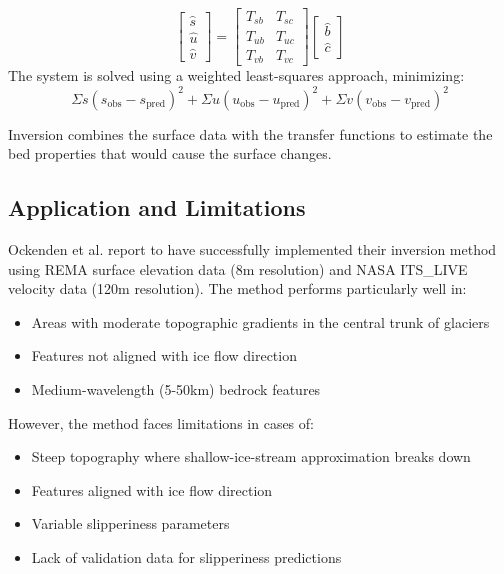 $$\begin{bmatrix}
\hat{s} \\
\hat{u} \\
\hat{v}
\end{bmatrix} =\begin{bmatrix}
T_{sb} & T_{sc} \\
T_{ub} & T_{uc} \\
T_{vb} & T_{vc}
\end{bmatrix}
\begin{bmatrix}
\hat{b}\\
\hat{c}
\end{bmatrix}$$
The system is solved using a weighted least-squares approach, minimizing:
\begin{equation}
\Sigma s(s_{\mathrm{obs}} - s_{\mathrm{pred}})^2 + \Sigma u(u_{\mathrm{obs}} - u_{\mathrm{pred}})^2 + \Sigma v(v_{\mathrm{obs}} - v_{\mathrm{pred}})^2
\end{equation}

Inversion combines the surface data with the transfer functions to estimate the bed properties that would cause the surface changes.

\subsection*{Application and Limitations}

Ockenden et al. report to have successfully implemented their inversion method using REMA surface elevation data (8m resolution) and NASA ITS\_LIVE velocity data (120m resolution). The method performs particularly well in:
\begin{itemize}
\item Areas with moderate topographic gradients in the central trunk of glaciers
\item Features not aligned with ice flow direction
\item Medium-wavelength (5-50km) bedrock features
\end{itemize}
However, the method faces limitations in cases of:
\begin{itemize}
\item Steep topography where shallow-ice-stream approximation breaks down
\item Features aligned with ice flow direction
\item Variable slipperiness parameters
\item Lack of validation data for slipperiness predictions
\end{itemize}

